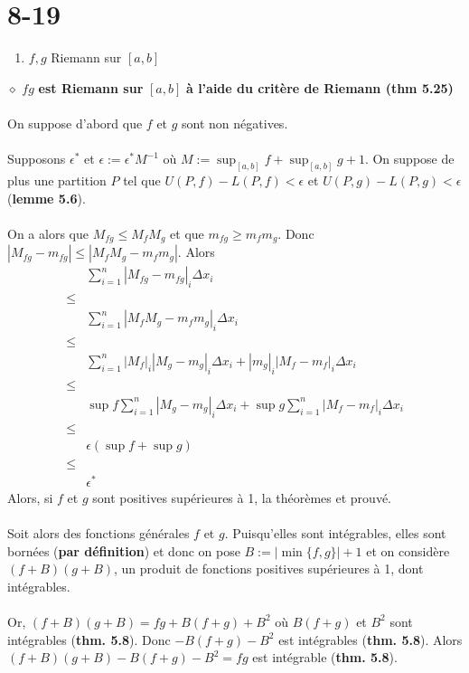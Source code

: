 \documentclass[a4paper,10pt]{article}
\begin{document}
\section*{8-19}
\begin{enumerate}
 \item $f,g$ Riemann sur $[a,b]$
\end{enumerate}
$\diamond$ $fg$ \textbf{ est Riemann sur } $[a,b]$ \textbf{ à l'aide du critère de Riemann (thm 5.25)}
\\
\\
On suppose d'abord que $f$ et $g$ sont non négatives.
\\
\\
Supposons $\epsilon^*$ et $\epsilon := \epsilon^* M^{-1}$ où $M := \sup_{[a,b]} f + \sup_{[a,b]} g + 1$. 
On suppose de plus une partition $P$ tel que $U(P,f) - L(P,f) < \epsilon$ et $U(P,g) - L(P,g) < \epsilon$ (\textbf{lemme 5.6}).
\\
\\
On a alors que $M_{fg} \leq M_f M_g$ et que $m_{fg} \geq m_f m_g$. Donc $|M_{fg} - m_{fg}| \leq |M_f M_g - m_f m_g|$. Alors
\begin{align*}
 & \sum_{i=1}^n |M_{fg} - m_{fg}|_i\Delta x_i \\
 \leq \\
 & \sum_{i=1}^n |M_f M_g - m_f m_g|_i \Delta x_i \\
 \leq \\
 & \sum_{i=1}^n |M_f|_i |M_g - m_g|_i \Delta x_i + |m_g|_i |M_f - m_f|_i \Delta x_i \\
 \leq \\
 & \sup{f} \sum_{i=1}^n |M_g - m_g|_i \Delta x_i + \sup{g} \sum_{i=1}^n |M_f - m_f|_i \Delta x_i \\
 \leq \\
 & \epsilon (\sup{f} + \sup{g}) \\
 \leq \\
 & \epsilon^*
\end{align*}
Alors, si $f$ et $g$ sont positives supérieures à 1, la théorèmes et prouvé.
\\
\\
Soit alors des fonctions générales $f$ et $g$. Puisqu'elles sont intégrables, elles sont bornées (\textbf{par définition}) et donc
on pose $B := |\min\{f,g\}| + 1$ et on considère $(f+B)(g+B)$, un produit de fonctions positives supérieures à 1, dont intégrables.
\\
\\
Or, $(f+B)(g+B) = fg + B(f+g) + B^2$ où $B(f+g)$ et $B^2$ sont intégrables (\textbf{thm. 5.8}). Donc $-B(f+g) - B^2$ est intégrables (\textbf{thm. 5.8}). Alors
$(f+B)(g+B) - B(f+g)-B^2 = fg$ est intégrable (\textbf{thm. 5.8}).
\end{document}
